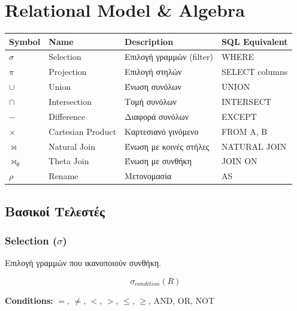
\chapter{Relational Model \& Algebra}

\begin{formulabox}
\begin{center}
\begin{tabular}{llll}
\toprule
\textbf{Symbol} & \textbf{Name} & \textbf{Description} & \textbf{SQL Equivalent} \\
\midrule
$\sigma$ & Selection & Επιλογή γραμμών (filter) & WHERE \\
$\pi$ & Projection & Επιλογή στηλών & SELECT columns \\
$\cup$ & Union & Ένωση συνόλων & UNION \\
$\cap$ & Intersection & Τομή συνόλων & INTERSECT \\
$-$ & Difference & Διαφορά συνόλων & EXCEPT \\
$\times$ & Cartesian Product & Καρτεσιανό γινόμενο & FROM A, B \\
$\bowtie$ & Natural Join & Ένωση με κοινές στήλες & NATURAL JOIN \\
$\bowtie_\theta$ & Theta Join & Ένωση με συνθήκη & JOIN ON \\
$\rho$ & Rename & Μετονομασία & AS \\
\bottomrule
\end{tabular}
\end{center}
\end{formulabox}

\section{Βασικοί Τελεστές}

\subsection{Selection (\texorpdfstring{$\sigma$}{sigma})}

\begin{definitionbox}[Selection]
Επιλογή γραμμών που ικανοποιούν συνθήκη.

\[
\sigma_{condition}(R)
\]

\textbf{Conditions:} $=$, $\neq$, $<$, $>$, $\leq$, $\geq$, AND, OR, NOT
\end{definitionbox}

